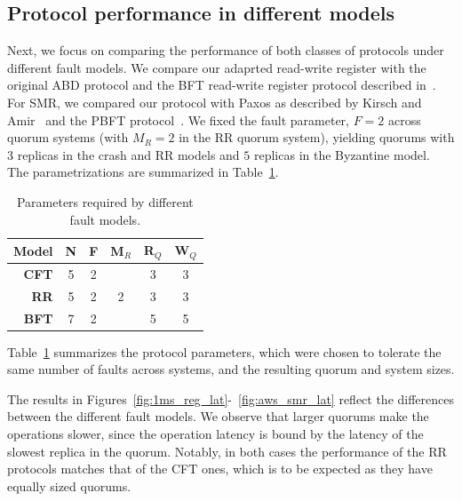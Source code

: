 \subsection{Protocol performance in different models}\label{ssec:eval_quorum}

Next, we focus on comparing the performance of both classes of protocols under different
fault models.
%
We compare our adaprted read-write register with the original ABD
protocol and the \ac{BFT} read-write register protocol described
in~\cite{Malkhi:Reiter:BQS:98}. For SMR, we compared our protocol with
Paxos as described by Kirsch and Amir~\cite{paxos_builders} and the
PBFT protocol~\cite{pbft}. We fixed the fault parameter, $F= 2$ across
quorum systems (with $M_R=2$ in the \ac{RR} quorum system),
yielding quorums with $3$ replicas in the crash and
\ac{RR} models and $5$ replicas in the Byzantine model. The
parametrizations are summarized in
Table~\ref{table:quorum_sizes}.

\begin{table}[b]
    \centering
    \begin{tabular}{|r || c | c | c || c | c |}
        \hline
        \textbf{Model}       & N & F & M$_R$ & R$_Q$ & W$_Q$\\ \hline
        \textbf{\ac{CFT}}         & 5 & 2 &   &   3   &   3  \\
        \textbf{\ac{RR}} & 5 & 2 & 2 &   3   &   3  \\
        \textbf{\ac{BFT}}         & 7 & 2 &   &   5   &   5  \\ \hline
    \end{tabular}
    \caption{Parameters required by different fault models.}\label{table:quorum_sizes}
\end{table}

Table~\ref{table:quorum_sizes} summarizes the protocol parameters,
which were chosen to tolerate the same number of faults across
systems, and the resulting quorum and system sizes.

The results in Figures~\ref{fig:1ms_reg_lat}-~\ref{fig:aws_smr_lat}
reflect the differences between the different fault models.  We
observe that larger quorums make the operations slower, since the
operation latency is bound by the latency of the slowest replica in
the quorum. Notably, in both cases the performance of the
\ac{RR} protocols matches that of the \ac{CFT} ones, which is to be
expected as they have equally sized quorums.

